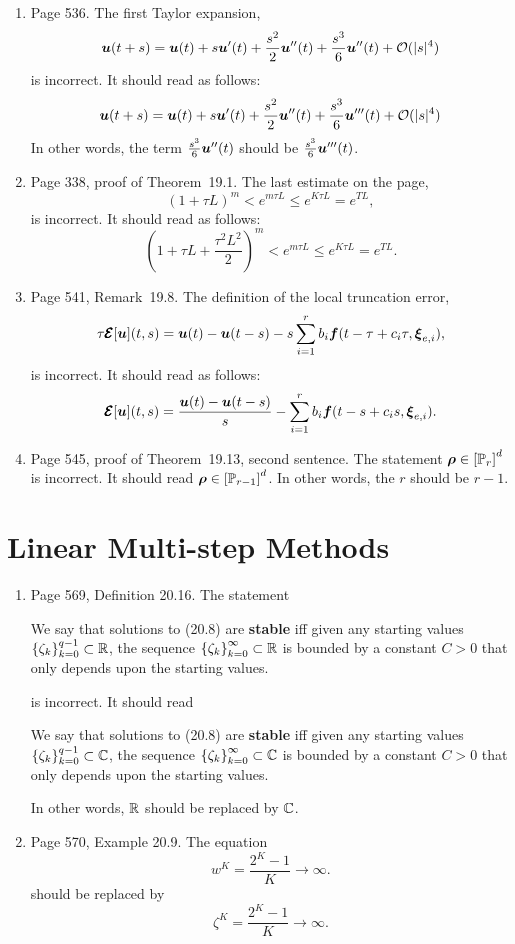 \documentclass{book}
\begin{document}
	\begin{enumerate}
	\item
Page 536. The first Taylor expansion,
	\[
  \boldsymbol{u}(t+s) = \boldsymbol{u}(t) + s \boldsymbol{u}'(t) + \frac{s^2}{2} \boldsymbol{u}''(t) + \frac{s^3}6 \boldsymbol{u}''(t) + {\mathcal O}(|s|^4)
	\] 
is incorrect. It should read as follows:
	\[
\boldsymbol{u}(t+s) = \boldsymbol{u}(t) + s \boldsymbol{u}'(t) + \frac{s^2}{2} \boldsymbol{u}''(t) + \frac{s^3}6 \boldsymbol{u}'''(t) + {\mathcal O}(|s|^4)
	\] 
In other words, the term $\frac{s^3}6 \boldsymbol{u}''(t)$ should be $\frac{s^3}6 \boldsymbol{u}'''(t)$.	
	
	\item
Page 338, proof of Theorem~19.1. The last estimate on the page,
	\[
(1+\tau L)^m < e^{m \tau L} \le e^{K\tau L}  = e^{TL},
	\]
is incorrect. It should read as follows:
	\[
\left(1+\tau L +\frac{\tau^2 L^2}{2}\right)^m < e^{m \tau L} \le e^{K\tau L}  = e^{TL} .
	\]
	
	\item
Page 541, Remark~19.8. The definition of the local truncation error,
\[
  \tau \pmb{\mathcal{E}}[\boldsymbol{u}](t,s) =  \boldsymbol{u}(t) - \boldsymbol{u}(t-s) - s\sum_{i=1}^r b_i \boldsymbol{f}(t-\tau+c_i \tau,{\boldsymbol \xi}_{e,i}) ,
\]
is incorrect. It should read as follows:
	\[
 \pmb{\mathcal{E}}[\boldsymbol{u}](t,s) =  \frac{\boldsymbol{u}(t) - \boldsymbol{u}(t-s)}{s} - \sum_{i=1}^r b_i \boldsymbol{f}(t-s+c_i s,{\boldsymbol \xi}_{e,i}) .
	\]
	
	\item
Page 545, proof of Theorem~19.13, second sentence. The statement $\boldsymbol{\rho }\in \left[ {\mathbb P}_r\right]^d$ is incorrect.  It should read $\boldsymbol{\rho }\in \left[ {\mathbb P}_{r-1}\right]^d$. In other words, the $r$ should be $r-1$.
	
	\end{enumerate}
	
\chapter{Linear Multi-step Methods}

	\begin{enumerate}
	
	\item
Page 569, Definition 20.16. The statement 

\qquad We say that solutions to (20.8) are \textbf{stable} iff given any starting values $\left\{\zeta_k \right\}_{k=0}^{q-1} \subset \mathbb R$, the sequence $\left\{\zeta_k \right\}_{k=0}^\infty \subset \mathbb R$ is bounded by a constant $C>0$ that only depends upon the starting values.

is incorrect. It should read

\qquad We say that solutions to (20.8) are \textbf{stable} iff given any starting values $\left\{\zeta_k \right\}_{k=0}^{q-1} \subset \mathbb C$, the sequence $\left\{\zeta_k \right\}_{k=0}^\infty \subset \mathbb C$ is bounded by a constant $C>0$ that only depends upon the starting values.

In other words, $\mathbb R$ should be replaced by $\mathbb C$.

	\item
Page 570, Example 20.9. The equation   
	\[
w^K = \frac{2^K-1}{K} \to \infty.
	\]
should be replaced by
	\[
\zeta^K = \frac{2^K-1}{K} \to \infty.
	\]
	\end{enumerate}
	
\end{document}
